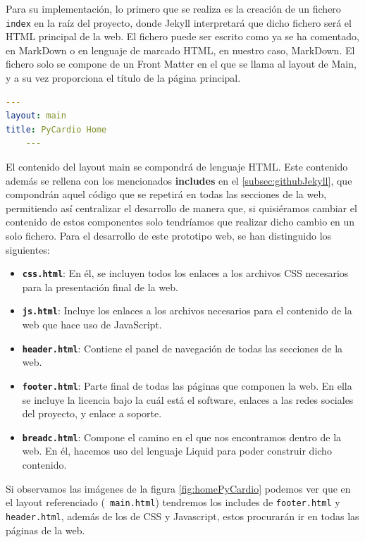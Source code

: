 Para su implementación, lo primero que se realiza es la creación de un fichero \texttt{index} en la raíz del proyecto, donde Jekyll interpretará que dicho fichero será el HTML principal de la web. El fichero puede ser escrito como ya se ha comentado, en MarkDown o en lenguaje de marcado HTML, en nuestro caso, MarkDown. El fichero solo se compone de un Front Matter en el que se llama al layout de Main, y a su vez proporciona el título de la página principal.
\begin{lstlisting}[language=yaml,caption=index.md. Fichero de home de PyCardio,label=co]
    ---
layout: main
title: PyCardio Home
    ---
\end{lstlisting}

El contenido del layout main se compondrá de lenguaje HTML. Este contenido además se rellena con los mencionados \textbf{includes} en el \ref{subsec:githubJekyll}, que compondrán aquel código que se repetirá en todas las secciones de la web, permitiendo así centralizar el desarrollo de manera que, si quisiéramos cambiar el contenido de estos componentes solo tendríamos que realizar dicho cambio en un solo fichero. Para el desarrollo de este prototipo web, se han distinguido los siguientes:
\begin{itemize}
    \item \textbf{\texttt{css.html}}: En él, se incluyen todos los enlaces a los archivos CSS necesarios para la presentación final de la web.
    \item \textbf{\texttt{js.html}}: Incluye los enlaces a los archivos necesarios para el contenido de la web que hace uso de JavaScript.
    \item \textbf{\texttt{header.html}}: Contiene el panel de navegación de todas las secciones de la web.
    \item \textbf{\texttt{footer.html}}: Parte final de todas las páginas que componen la web. En ella se incluye la licencia bajo la cuál está el software, enlaces a las redes sociales del proyecto, y enlace a soporte.
    \item \textbf{\texttt{breadc.html}}: Compone el camino en el que nos encontramos dentro de la web. En él, hacemos uso del lenguaje Liquid para poder construir dicho contenido. 
\end{itemize}

Si observamos las imágenes de la figura \ref{fig:homePyCardio} podemos ver que en el layout referenciado (\texttt{ main.html})  tendremos los includes de \texttt{footer.html} y \texttt{header.html}, además de los de CSS y Javascript, estos procurarán ir en todas las páginas de la web. 

